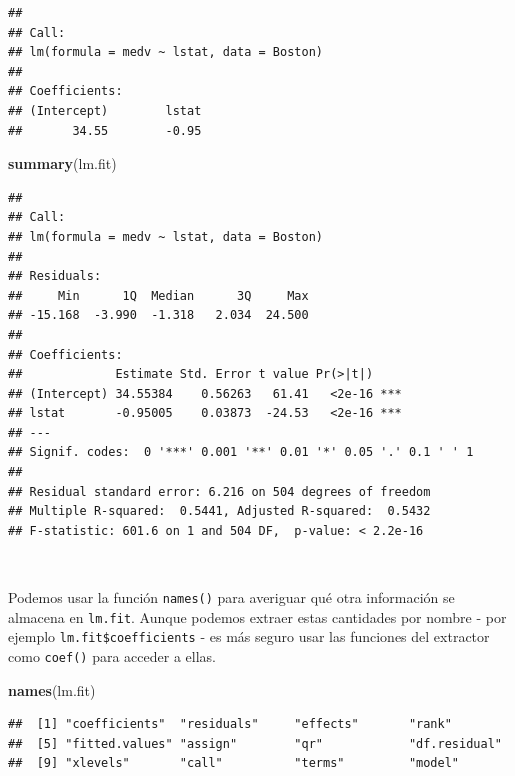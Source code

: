 \documentclass[]{book}
\newenvironment{Shaded}{\begin{snugshade}}{\end{snugshade}}
\newcommand{\KeywordTok}[1]{\textcolor[rgb]{0.13,0.29,0.53}{\textbf{#1}}}
\newcommand{\OperatorTok}[1]{\textcolor[rgb]{0.81,0.36,0.00}{\textbf{#1}}}
\newcommand{\NormalTok}[1]{#1}
\begin{document}
\begin{verbatim}
## 
## Call:
## lm(formula = medv ~ lstat, data = Boston)
## 
## Coefficients:
## (Intercept)        lstat  
##       34.55        -0.95
\end{verbatim}

\begin{Shaded}
\begin{Highlighting}[]
\KeywordTok{summary}\NormalTok{(lm.fit)}
\end{Highlighting}
\end{Shaded}

\begin{verbatim}
## 
## Call:
## lm(formula = medv ~ lstat, data = Boston)
## 
## Residuals:
##     Min      1Q  Median      3Q     Max 
## -15.168  -3.990  -1.318   2.034  24.500 
## 
## Coefficients:
##             Estimate Std. Error t value Pr(>|t|)    
## (Intercept) 34.55384    0.56263   61.41   <2e-16 ***
## lstat       -0.95005    0.03873  -24.53   <2e-16 ***
## ---
## Signif. codes:  0 '***' 0.001 '**' 0.01 '*' 0.05 '.' 0.1 ' ' 1
## 
## Residual standard error: 6.216 on 504 degrees of freedom
## Multiple R-squared:  0.5441, Adjusted R-squared:  0.5432 
## F-statistic: 601.6 on 1 and 504 DF,  p-value: < 2.2e-16
\end{verbatim}

~

Podemos usar la función \texttt{names()} para averiguar qué otra
información se almacena en \texttt{lm.fit}. Aunque podemos extraer estas
cantidades por nombre - por ejemplo \texttt{lm.fit\$coefficients} - es
más seguro usar las funciones del extractor como \texttt{coef()} para
acceder a ellas.

\begin{Shaded}
\begin{Highlighting}[]
\KeywordTok{names}\NormalTok{(lm.fit)}
\end{Highlighting}
\end{Shaded}

\begin{verbatim}
##  [1] "coefficients"  "residuals"     "effects"       "rank"         
##  [5] "fitted.values" "assign"        "qr"            "df.residual"  
##  [9] "xlevels"       "call"          "terms"         "model"
\end{verbatim}

\begin{Shaded}
\end{Shaded}
\end{document}
